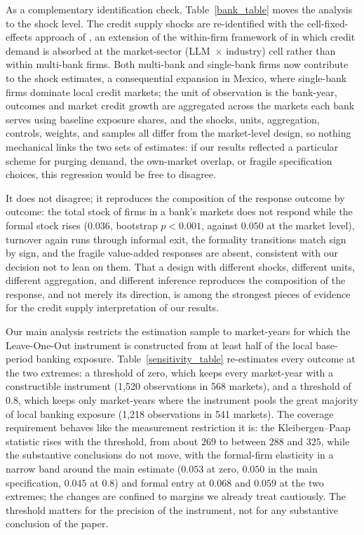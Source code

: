 \documentclass[12pt]{article}
\begin{document}
As a complementary identification check, Table~\ref{bank_table} moves the analysis to the shock level. The credit supply shocks are re-identified with the cell-fixed-effects approach of \citet{degryse2019identifying}, an extension of the within-firm framework of \citet{khwaja2008tracing} in which credit demand is absorbed at the market-sector (LLM~$\times$ industry) cell rather than within multi-bank firms. Both multi-bank and single-bank firms now contribute to the shock estimates, a consequential expansion in Mexico, where single-bank firms dominate local credit markets; the unit of observation is the bank-year, outcomes and market credit growth are aggregated across the markets each bank serves using baseline exposure shares, and the shocks, units, aggregation, controls, weights, and samples all differ from the market-level design, so nothing mechanical links the two sets of estimates: if our results reflected a particular scheme for purging demand, the own-market overlap, or fragile specification choices, this regression would be free to disagree.

It does not disagree; it reproduces the composition of the response outcome by outcome: the total stock of firms in a bank's markets does not respond while the formal stock rises ($0.036$, bootstrap $p < 0.001$, against $0.050$ at the market level), turnover again runs through informal exit, the formality transitions match sign by sign, and the fragile value-added responses are absent, consistent with our decision not to lean on them. That a design with different shocks, different units, different aggregation, and different inference reproduces the composition of the response, and not merely its direction, is among the strongest pieces of evidence for the credit supply interpretation of our results.

Our main analysis restricts the estimation sample to market-years for which the Leave-One-Out instrument is constructed from at least half of the local base-period banking exposure. Table~\ref{sensitivity_table} re-estimates every outcome at the two extremes: a threshold of zero, which keeps every market-year with a constructible instrument (1,520 observations in 568 markets), and a threshold of $0.8$, which keeps only market-years where the instrument pools the great majority of local banking exposure (1,218 observations in 541 markets). The coverage requirement behaves like the measurement restriction it is: the Kleibergen--Paap statistic rises with the threshold, from about $269$ to between $288$ and $325$, while the substantive conclusions do not move, with the formal-firm elasticity in a narrow band around the main estimate ($0.053$ at zero, $0.050$ in the main specification, $0.045$ at $0.8$) and formal entry at $0.068$ and $0.059$ at the two extremes; the changes are confined to margins we already treat cautiously. The threshold matters for the precision of the instrument, not for any substantive conclusion of the paper.
\end{document}
